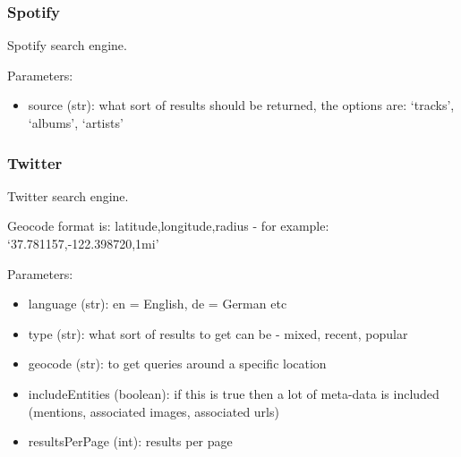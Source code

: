 \documentclass[letterpaper,10pt,english]{sphinxmanual}
\begin{document}
\subsubsection{Spotify}
\label{api3.0:spotify}

\begin{fulllineitems}
\label{api3.0:puppy.search.engine.Spotify}
Spotify search engine.

Parameters:
\begin{itemize}
\item {} 
source (str):  what sort of results should be returned, the options are: `tracks', `albums', `artists'

\end{itemize}

\end{fulllineitems}



\subsubsection{Twitter}
\label{api3.0:twitter}

\begin{fulllineitems}
\label{api3.0:puppy.search.engine.Twitter}
Twitter search engine.

Geocode format is: latitude,longitude,radius - for example: `37.781157,-122.398720,1mi'

Parameters:
\begin{itemize}
\item {} 
language (str): en = English, de = German etc

\item {} 
type (str): what sort of results to get can be - mixed, recent, popular

\item {} 
geocode (str): to get queries around a specific location

\item {} 
includeEntities (boolean): if this is true then a lot of meta-data is included (mentions, associated images, associated urls)

\item {} 
resultsPerPage (int): results per page

\end{itemize}

\end{fulllineitems}
\end{document}
